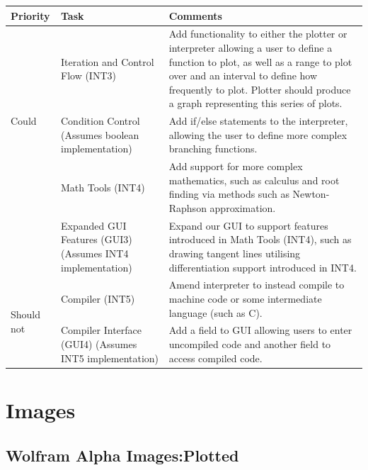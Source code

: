 \documentclass[a4paper, oneside, 11pt]{report}
\begin{document}
    \begin{center}
        \begin{tabular}{|p{1in}|p{2in}|p{2.5in}|} \hline
        Priority & Task & Comments \\ \hline \hline
        \multirow{3}{1in}{Could}
        & Iteration and Control Flow (INT3) & Add functionality to either the plotter or interpreter allowing a user to define a function to plot, as well as a range to plot over and an interval to define how frequently to plot. Plotter should produce a graph representing this series of plots. \\ \cline{2-3}
        & Condition Control (Assumes boolean implementation) & Add if/else statements to the interpreter, allowing the user to define more complex branching functions. \\ \cline{2-3}
        & Math Tools (INT4) & Add support for more complex mathematics, such as calculus and root finding via methods such as Newton-Raphson approximation.\\ \cline{2-3}
        & Expanded GUI Features (GUI3) (Assumes INT4 implementation) & Expand our GUI to support features introduced in Math Tools (INT4), such as drawing tangent lines utilising differentiation support introduced in INT4.\\\hline \hline

        \multirow{3}{1in}{Should not}
        & Compiler (INT5) & Amend interpreter to instead compile to machine code or some intermediate language (such as C). \\ \cline{2-3}
        & Compiler Interface (GUI4) (Assumes INT5 implementation) & Add a field to GUI allowing users to enter uncompiled code and another field to access compiled code. \\ \hline
        \end{tabular}
    \end{center}

    \chapter{Images}
    \section{Wolfram Alpha Images:Plotted} \label{WolframPlotted}
\end{document}
